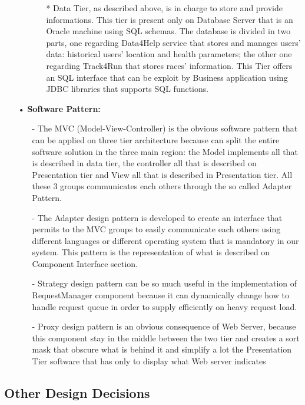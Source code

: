 \begin{enumerate}
\begin{enumerate}
\begin{enumerate}
	\item[*] Data Tier, as described above, is in charge to store and provide informations. This tier is present only on Database Server that is an Oracle machine using SQL schemas. The database is divided in two parts, one regarding Data4Help service that stores and manages users' data: historical users' location and health parameters; the other one regarding Track4Run that stores races' information. This Tier offers an SQL interface that can be exploit by Business application using JDBC libraries that supports SQL functions. 
		\end{enumerate}
	
	\end{enumerate}

\item[•] \textbf{Software Pattern: }

	\begin{enumerate}
	\item[-] The MVC (Model-View-Controller) is the obvious software pattern that can be applied on three tier architecture because can split the entire software solution in the three main region: the Model implements all that is described in data tier, the controller all that is described on Presentation tier and View all that is described in Presentation tier. All these 3 groups communicates each others through the so called Adapter Pattern.
	\item[-] The Adapter design pattern is developed to create an interface that permits to the MVC groups to easily communicate each others using different languages or different operating system that is mandatory in our system. This pattern is the representation of what is described on Component Interface section.
	\item[-] Strategy design pattern can be so much useful in the implementation of RequestManager component because it can dynamically change how to handle request queue in order to supply efficiently on heavy request load.
	\item[-] Proxy design pattern is an obvious consequence of Web Server, because this component stay in the middle between the two tier and creates a sort mask  that obscure what is behind it and simplify a lot the Presentation Tier software that has only to display what Web server indicates	
	\end{enumerate}

\end{enumerate}


\subsection{Other Design Decisions}